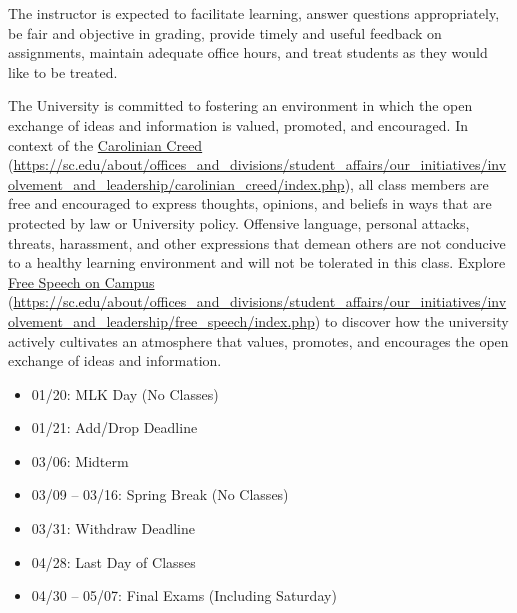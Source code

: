 \documentclass[11pt,letterpaper]{article}
\begin{document}

The instructor is expected to facilitate learning, answer questions appropriately, be fair and objective in grading, provide timely and useful feedback on assignments, maintain adequate office hours, and treat students as they would like to be treated. \sectionbreak





\newpage






The University is committed to fostering an environment in which the open exchange of ideas and information is valued, promoted, and encouraged.  In context of the \href{https://sc.edu/about/offices\_and\_divisions/student\_affairs/our\_initiatives/involvement\_and\_leadership/carolinian\_creed/index.php}{Carolinian Creed} (\url{https://sc.edu/about/offices\_and\_divisions/student\_affairs/our\_initiatives/involvement\_and\_leadership/carolinian\_creed/index.php}), all class members are free and encouraged to express thoughts, opinions, and beliefs in ways that are protected by law or University policy. Offensive language, personal attacks, threats, harassment, and other expressions that demean others are not conducive to a healthy learning environment and will not be tolerated in this class. Explore \href{https://sc.edu/about/offices\_and\_divisions/student\_affairs/our\_initiatives/involvement\_and\_leadership/free\_speech/index.php}{Free Speech on Campus} (\url{https://sc.edu/about/offices\_and\_divisions/student\_affairs/our\_initiatives/involvement\_and\_leadership/free\_speech/index.php}) to discover how the university actively cultivates an atmosphere that values, promotes, and encourages the open exchange of ideas and information. \sectionbreak




	\begin{itemize}
	\item 01/20: MLK Day (No Classes)
	\item 01/21: Add/Drop Deadline
	\item 03/06: Midterm
	\item 03/09 -- 03/16: Spring Break (No Classes)
	\item 03/31: Withdraw Deadline
	\item 04/28: Last Day of Classes
	\item 04/30 -- 05/07: Final Exams (Including Saturday)
	\end{itemize}
\end{document}
